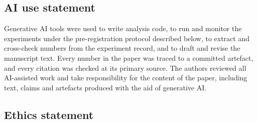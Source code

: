 \subsection*{AI use statement}

Generative AI tools were used to write analysis code, to run and monitor the experiments under
the pre-registration protocol described below, to extract and cross-check numbers from the
experiment record, and to draft and revise the manuscript text. Every number in the paper was
traced to a committed artefact, and every citation was checked at its primary source. The
authors reviewed all AI-assisted work and take responsibility for the content of the paper,
including text, claims and artefacts produced with the aid of generative AI.

\subsection*{Ethics statement}

